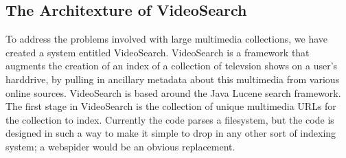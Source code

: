 \documentclass{acm_proc_article-sp}
\begin{document}
\subsection{The Architexture of VideoSearch}
    To address the problems involved with large multimedia collections, we have created a system entitled VideoSearch.  VideoSearch is a framework that augments the creation of an index of a collection of televsion shows on a user\textquoteright s harddrive, by pulling in ancillary metadata about this multimedia from various online sources.  VideoSearch is based around the Java Lucene search framework.  The first stage in VideoSearch is the collection of unique multimedia URLs for the collection to index. Currently the code parses a filesystem, but the code is designed in such a way to make it simple to drop in any other sort of indexing system; a webspider would be an obvious replacement.  
\end{document}

